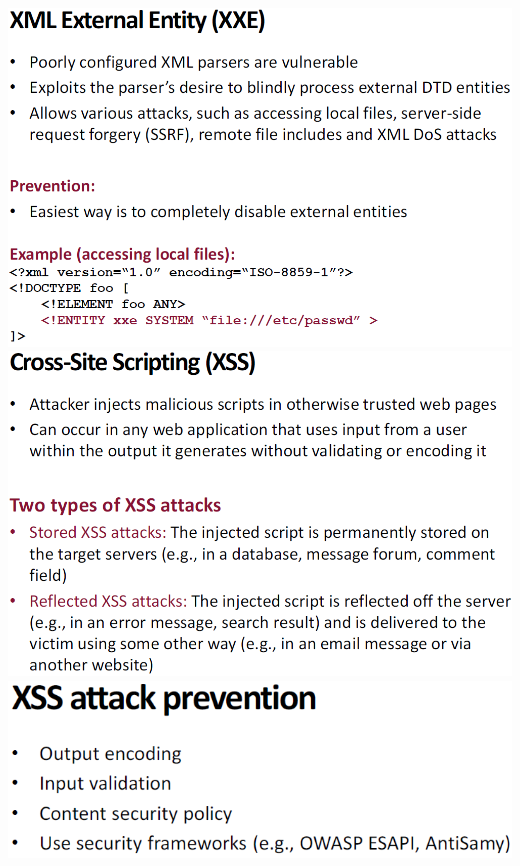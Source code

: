 \documentclass[12pt]{article}
\begin{document}
 \includegraphics[width=0.9\linewidth]{./slides/L8P2XXE.PNG}\\
 \includegraphics[width=0.9\linewidth]{./slides/L8P2XSS.PNG}\\
 \includegraphics[width=0.9\linewidth]{./slides/L8P2XSSPREV.PNG}
 
\end{document}
